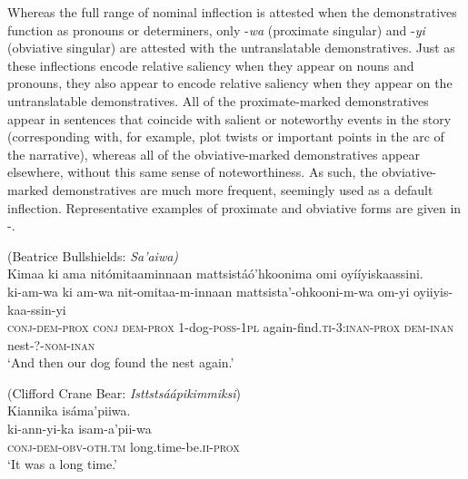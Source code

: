 \documentclass[output=paper,colorlinks,citecolor=brown]{langscibook}
\begin{document}
Whereas the full range of nominal inflection is attested when the demonstratives function as pronouns or determiners, only -\textit{wa} (proximate singular) and -\textit{yi} (obviative singular) are attested with the untranslatable demonstratives. Just as these inflections encode relative saliency when they appear on nouns and pronouns, they also appear to encode relative saliency when they appear on the untranslatable demonstratives. All of the proximate-marked demonstratives appear in sentences that coincide with salient or noteworthy events in the story (corresponding with, for example, plot twists or important points in the arc of the narrative), whereas all of the obviative-marked demonstratives appear elsewhere, without this same sense of noteworthiness. As such, the obviative-marked demonstratives are much more frequent, seemingly used as a default inflection. Representative examples of proximate and obviative forms are given in -.

\ea\label{ex:bliss:15} (Beatrice Bullshields: \textit{Sa’aiwa)}\\
{Kimaa ki ama nitómitaaminnaan mattsistáó’hkoonima omi oyííyiskaassini.}\\
\gll ki-am-wa ki am-wa nit-omitaa-m-innaan mattsista’-ohkooni-m-wa om-yi oyiiyis-kaa-ssin-yi\\
     \textsc{conj-dem-prox} \textsc{conj} \textsc{dem-prox} \textsc{1-}dog-\textsc{poss-1pl} again-find.\textsc{ti-3:inan-prox} \textsc{dem-inan} nest-?-\textsc{nom-inan}\\
 ‘And then our dog found the nest again.’ 
\z

\ea\label{ex:bliss:16} (Clifford Crane Bear: \textit{Isttstsáápikimmiksi})\\
{Kiannika isáma’piiwa.}\\
\gll ki-ann-yi-ka isam-a’pii-wa\\
     \textsc{conj-dem-obv-oth.tm} long.time-be.\textsc{ii-prox}\\
 ‘It was a long time.’ 
\z
\end{document}
